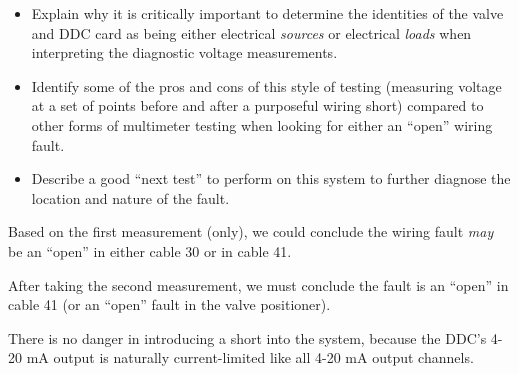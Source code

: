 \begin{itemize}
\item{} Explain why it is critically important to determine the identities of the valve and DDC card as being either electrical {\it sources} or electrical {\it loads} when interpreting the diagnostic voltage measurements.
\item{} Identify some of the pros and cons of this style of testing (measuring voltage at a set of points before and after a purposeful wiring short) compared to other forms of multimeter testing when looking for either an ``open'' wiring fault.
\item{} Describe a good ``next test'' to perform on this system to further diagnose the location and nature of the fault.
\end{itemize}














Based on the first measurement (only), we could conclude the wiring fault {\it may} be an ``open'' in either cable 30 or in cable 41.

\vskip 10pt

After taking the second measurement, we must conclude the fault is an ``open'' in cable 41 (or an ``open'' fault in the valve positioner).
\vskip 10pt

There is no danger in introducing a short into the system, because the DDC's 4-20 mA output is naturally current-limited like all 4-20 mA output channels.




